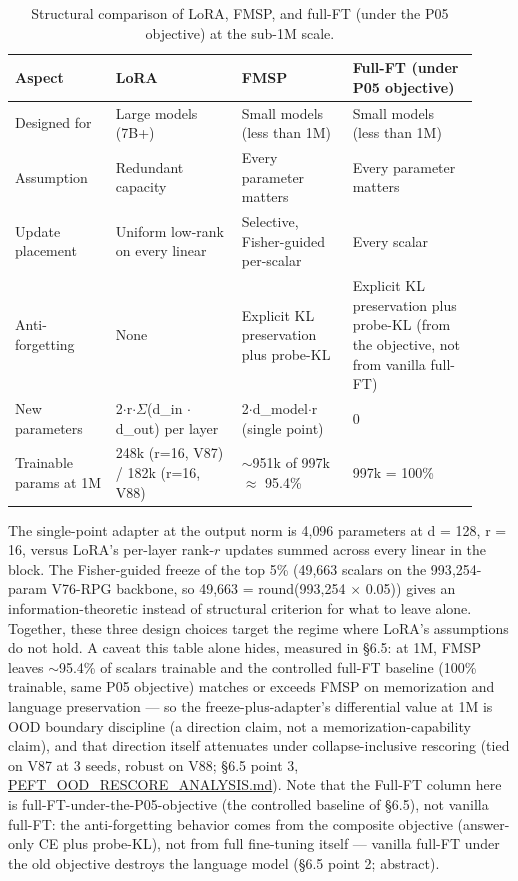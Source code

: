 \documentclass[11pt]{article}
\begin{document}
\begin{table}[!t]
\centering
\small
\caption{Structural comparison of LoRA, FMSP, and full-FT (under the P05 objective) at the sub-1M scale.}
\label{tab:3-8-struct}
\begin{tabular}{p{0.20\linewidth} p{0.25\linewidth} p{0.22\linewidth} p{0.25\linewidth}}
\toprule
Aspect & LoRA & FMSP & Full-FT (under P05 objective) \\
\midrule
Designed for & Large models (7B+) & Small models (less than 1M) & Small models (less than 1M) \\
Assumption & Redundant capacity & Every parameter matters & Every parameter matters \\
Update placement & Uniform low-rank on every linear & Selective, Fisher-guided per-scalar & Every scalar \\
Anti-forgetting & None & Explicit KL preservation plus probe-KL & Explicit KL preservation plus probe-KL (from the objective, not from vanilla full-FT) \\
New parameters & 2$\cdot$r$\cdot$$\Sigma$(d\_in $\cdot$ d\_out) per layer & 2$\cdot$d\_model$\cdot$r (single point) & 0 \\
Trainable params at 1M & 248k (r=16, V87) / 182k (r=16, V88) & $\sim$951k of 997k $\approx$ 95.4\% & 997k = 100\% \\
\bottomrule
\end{tabular}
\end{table}

The single-point adapter at the output norm is 4{,}096 parameters at d = 128, r = 16, versus LoRA's per-layer rank-$r$ updates summed across every linear in the block. The Fisher-guided freeze of the top 5\% (49{,}663 scalars on the 993{,}254-param V76-RPG backbone, so 49{,}663 = round(993{,}254 $\times$ 0.05)) gives an information-theoretic instead of structural criterion for what to leave alone. Together, these three design choices target the regime where LoRA's assumptions do not hold. A caveat this table alone hides, measured in \S6.5: at 1M, FMSP leaves $\sim$95.4\% of scalars trainable and the controlled full-FT baseline (100\% trainable, same P05 objective) matches or exceeds FMSP on memorization and language preservation --- so the freeze-plus-adapter's differential value at 1M is OOD boundary discipline (a direction claim, not a memorization-capability claim), and that direction itself attenuates under collapse-inclusive rescoring (tied on V87 at 3 seeds, robust on V88; \S6.5 point 3, \href{https://github.com/llaa33219/MicroMixer-4/blob/4bb630413dfa58ef3141291e121ab8c006d03235/PEFT_OOD_RESCORE_ANALYSIS.md}{PEFT\_OOD\_RESCORE\_ANALYSIS.md}). Note that the Full-FT column here is full-FT-under-the-P05-objective (the controlled baseline of \S6.5), not vanilla full-FT: the anti-forgetting behavior comes from the composite objective (answer-only CE plus probe-KL), not from full fine-tuning itself --- vanilla full-FT under the old objective destroys the language model (\S6.5 point 2; abstract).
\end{document}
